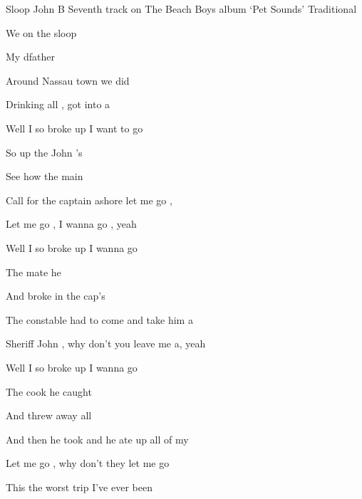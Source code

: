 \begin{SBSong}{Sloop John B}
  {Seventh track on The Beach Boys album `Pet Sounds'}
  {Traditional}
  \begin{SBVerse}
    We  on the sloop  
    
    My dfather  
    
    Around Nassau town we did 
    
    Drinking all ,  got into a   
        
    Well I  so broke up I want to go 
  \end{SBVerse}
  \begin{SBChorus}
    So  up the John 's 

    See how the main 
    
    Call for the captain ashore let me go ,
    
    Let me go ,  I wanna go , yeah 
    
    Well I  so broke up  I  wanna go 
  \end{SBChorus}
  \begin{SBVerse}
    The  mate he  
    
    And broke in the cap's 
    
    The constable had to come and take him a
    
    Sheriff John ,  why don't you leave me a, yeah 
    
    Well I  so broke up  I wanna go 
  \end{SBVerse}
  \begin{SBVerse}
    The  cook he caught  
    
    And threw away all  
    
    And then he took and he ate up all of my 
    
    Let me go ,  why don't they let me go  
    
    This  the worst trip  I've ever been 
  \end{SBVerse}
\end{SBSong}

